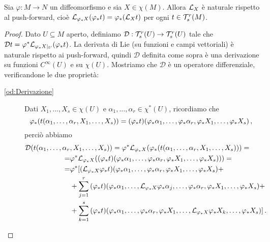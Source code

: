 \begin{proposition}
	Sia $\varphi: M \to N$ un diffeomorfismo e sia $X\in\chi(M)$. Allora $\mathcal L_X$ è naturale rispetto al push-forward, cioè $\mathcal L_{\varphi_*X} (\varphi_*t) = \varphi_*(\mathcal L_Xt)$ per ogni $t\in\mathcal T_s^r(M)$.
\end{proposition}
\begin{proof}
	Dato $U\subseteq M$ aperto, definiamo $\mathcal D: \mathcal T_s^r(U) \to \mathcal T_s^r(U)$ tale che $\mathcal Dt = \varphi^*\mathcal L_{\varphi_*X|_ U}(\varphi_*t)$.
	La derivata di Lie (su funzioni e campi vettoriali) è naturale rispetto ai push-forward, quindi $\mathcal D$ definita come sopra è una derivazione su funzioni $C^\infty(U)$ e su $\chi(U)$.
	Mostriamo che $\mathcal D$ è un operatore differenziale, verificandone le due proprietà:
	\begin{description}
	 \item [\ref{od:Derivazione}]
	Dati $X_1,\ldots,X_s\in\chi(U)$ e $\alpha_1,\ldots,\alpha_r\in\chi^*(U)$, ricordiamo che
	\begin{equation*}
	\varphi_*(t(\alpha_1,\ldots,\alpha_r,X_1,\ldots,X_s) )= (\varphi_*t)(\varphi_*\alpha_1,\ldots,\varphi_*\alpha_r,\varphi_*X_1,\ldots,\varphi_*X_s)\, \text{, }
	\end{equation*}
	perciò abbiamo
	\begin{align*}
		\mathcal D(t(\alpha_1,\ldots,\alpha_r&,X_1,\ldots,X_s)) = \varphi^*\mathcal L_{\varphi_*X}(\varphi_*(t(\alpha_1,\ldots,\alpha_r,X_1,\ldots,X_s))) =\\
		=& \varphi^*\mathcal L_{\varphi_*X}((\varphi_*t)(\varphi_*\alpha_1,\ldots,\varphi_*\alpha_r,\varphi_*X_1,\ldots,\varphi_*X_s))) = \\
		=& \varphi^*[(\mathcal L_{\varphi_*X}\varphi_*t)(\varphi_*\alpha_1,\ldots,\varphi_*\alpha_r,\varphi_*X_1,\ldots,\varphi_*X_s) +\\
		&+\sum_{j=1}^r{(\varphi_*t)(\varphi_*\alpha_1,\ldots,\mathcal L_{\varphi_*X}\varphi_*\alpha_j,\ldots,\varphi_*\alpha_r,\varphi_*X_1,\ldots,\varphi_*X_s)} +\\
		&+\sum_{k=1}^s{(\varphi_*t)(\varphi_*\alpha_1,\ldots,\varphi_*\alpha_r,\varphi_*X_1,\ldots,\mathcal L_{\varphi_*X}\varphi_*X_k,\ldots,\varphi_*X_s)}] \, \text{. }
	\end{align*}	

\end{description}
\end{proof}
